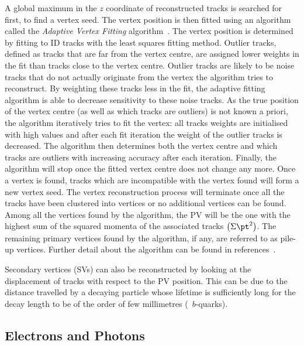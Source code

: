			A global maximum in the $z$ coordinate of reconstructed tracks is searched for first, to find a vertex seed. The vertex position is then fitted using an algorithm called the \emph{Adaptive Vertex Fitting} algorithm~\cite{ATL-PHYS-PUB-2015-026,Fruhwirth:2007hz}. The vertex position is determined by fitting to \ac{ID} tracks with the least squares fitting method. Outlier tracks, defined as tracks that are far from the vertex centre, are assigned lower weights in the fit than tracks close to the vertex centre. Outlier tracks are likely to be noise tracks that do not actually originate from the vertex the algorithm tries to reconstruct. By weighting these tracks less in the fit, the adaptive fitting algorithm is able to decrease sensitivity to these noise tracks. As the true position of the vertex centre (as well as which tracks are outliers) is not known a priori, the algorithm iteratively tries to fit the vertex: all tracks weights are initialised with high values and after each fit iteration the weight of the outlier tracks is decreased. The algorithm then determines both the vertex centre and which tracks are outliers with increasing accuracy after each iteration. Finally, the algorithm will stop once the fitted vertex centre does not change any more. Once a vertex is found, tracks which are incompatible with the vertex found will form a new vertex seed. The vertex reconstruction process will terminate once all the tracks have been clustered into vertices or no additional vertices can be found. Among all the vertices found by the algorithm, the \ac{PV} will be the one with the highest sum of the squared momenta of the associated tracks $\left ( \Sigma \pt^2 \right)$. The remaining primary vertices found by the algorithm, if any, are referred to as pile-up vertices. Further detail about the algorithm can be found in references~\cite{ATL-PHYS-PUB-2015-026,Fruhwirth:2007hz}. 

			Secondary vertices (\acs{SV}s) can also be reconstructed by looking at the displacement of tracks with respect to the \ac{PV} position. This can be due to the distance travelled by a decaying particle whose lifetime is sufficiently long for the decay length to be of the order of few millimetres (\eg\ $b$-quarks).


		\subsection*{Electrons and Photons}

